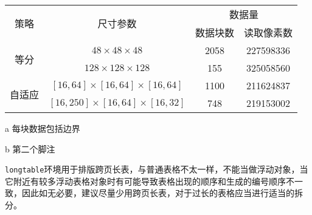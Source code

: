 \begin{table}[htbp]
\centering
  \begin{threeparttable}
    \newcommand{\chengs}{\ensuremath{\times}}
    \newcommand{\cheng}{\ensuremath{\!\times\!}}
    \label{tab:samples:threepart}
    \begin{tabular}{cccc} %
      \toprule
  \multirow{2}{*}{策略}   & \multirow{2}{*}{尺寸参数}             & \multicolumn{2}{c}{数据量}    \tabularnewline \cmidrule{3-4}
                         &                                      & 数据块数\tnote{a} & 读取像素数\tnote{b} \tabularnewline \midrule
  \multirow{2}{*}{等分}   & $48\chengs 48\chengs 48$             & 2058             & 227598336 \tabularnewline \cmidrule{2-4} %
                         & $128\chengs 128\chengs 128$          & 155              & 325058560 \tabularnewline \midrule
  \multirow{2}{*}{自适应} & $[16,64]\cheng[16,64]\cheng[16,64]$  & 1100             & 211624837  \tabularnewline \cmidrule{2-4}
                         & $[16,250]\cheng[16,64]\cheng[16,32]$ & 748              & 219153002  \tabularnewline %
      \bottomrule
    \end{tabular}
    \begin{tablenotes}\small
      \item[a] 每块数据包括边界
      \item[b] 第二个脚注
    \end{tablenotes}
  \end{threeparttable}
\end{table}

\texttt{longtable}环境用于排版跨页长表，与普通表格不太一样，不能当做浮动对象，当它附近有较多浮动表格对象时有可能导致表格出现的顺序和生成的编号顺序不一致，因此如无必要，建议尽量少用跨页长表，对于过长的表格应当进行适当的拆分。

